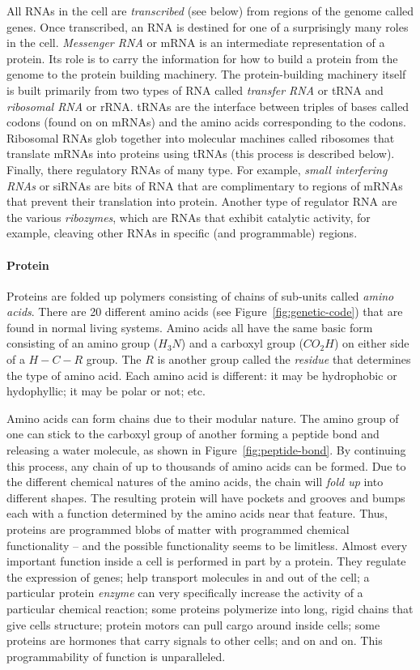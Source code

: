 All RNAs in the cell are {\em transcribed} (see below) from regions of
the genome called genes. Once transcribed, an RNA is destined for one
of a surprisingly many roles in the cell. {\em Messenger RNA} or mRNA
is an intermediate representation of a protein. Its role is to carry
the information for how to build a protein from the genome to the
protein building machinery. The protein-building machinery itself is
built primarily from two types of RNA called {\em transfer RNA} or
tRNA and {\em ribosomal RNA} or rRNA. tRNAs are the interface between
triples of bases called codons (found on on mRNAs) and the amino acids
corresponding to the codons. Ribosomal RNAs glob together into
molecular machines called ribosomes that translate mRNAs into proteins
using tRNAs (this process is described below). Finally, there
regulatory RNAs of many type. For example, {\em small interfering
  RNAs} or siRNAs are bits of RNA that are complimentary to regions of
mRNAs that prevent their translation into protein. Another type of
regulator RNA are the various {\em ribozymes}, which are RNAs that
exhibit catalytic activity, for example, cleaving other RNAs in
specific (and programmable) regions.

\paragraph{Protein} Proteins are folded up polymers consisting of
chains of sub-units called {\em amino acids}. There are 20 different
amino acids (see Figure~\ref{fig:genetic-code}) that are found in
normal living systems. Amino acids all have the same basic form
consisting of an amino group ($H_3N$) and a carboxyl group ($CO_2H$)
on either side of a $H-C-R$ group. The $R$ is another group called the
{\em residue} that determines the type of amino acid. Each amino acid
is different: it may be hydrophobic or hydophyllic; it may be polar or
not; etc. 

Amino acids can form chains due to their modular nature. The amino
group of one can stick to the carboxyl group of another forming a
peptide bond and releasing a water molecule, as shown in
Figure~\ref{fig:peptide-bond}. By continuing this process, any chain
of up to thousands of amino acids can be formed. Due to the different
chemical natures of the amino acids, the chain will {\em fold up} into
different shapes. The resulting protein will have pockets and grooves
and bumps each with a function determined by the amino acids near that
feature. Thus, proteins are programmed blobs of matter with programmed
chemical functionality -- and the possible functionality seems to be
limitless. Almost every important function inside a cell is performed
in part by a protein. They regulate the expression of genes; help
transport molecules in and out of the cell; a particular protein {\em
  enzyme} can very specifically increase the activity of a particular
chemical reaction; some proteins polymerize into long, rigid chains
that give cells structure; protein motors can pull cargo around inside
cells; some proteins are hormones that carry signals to other cells;
and on and on. This programmability of function is unparalleled.

